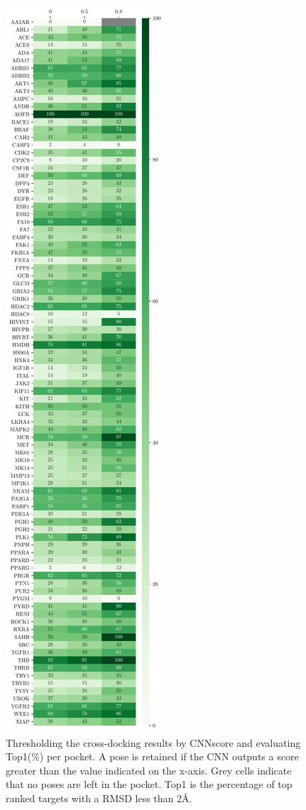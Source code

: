 \documentclass[journal=jcisd8,manuscript=article]{achemso}
\begin{document}
\begin{figure}
    \centering
    \includegraphics[height=0.9\textheight]{figures/crossdocking/thresh_top1_per_pocket.pdf}
    \caption{Thresholding the cross-docking results by CNNscore and evaluating Top1(\%) per pocket. A pose is retained if the CNN outputs a score greater than the value indicated on the x-axis. Grey cells indicate that no poses are left in the pocket. Top1 is the percentage of top ranked targets with a RMSD less than 2{\AA}.}
    \label{fig:Thresh_PerPock}
\end{figure}
\end{document}
